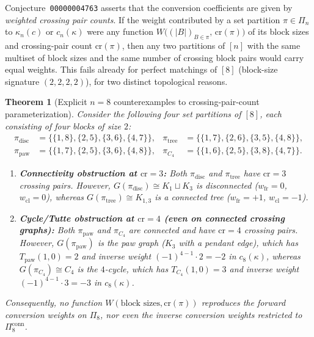 \documentclass[11pt,a4paper]{article}
\newtheorem{theorem}{Theorem}[section]
\theoremstyle{definition}
\theoremstyle{remark}
\newcommand{\conn}{\mathrm{conn}}
\newcommand{\crpair}{\mathrm{cr}}
\newcommand{\cl}{\mathrm{cl}}
\newcommand{\fr}{\mathrm{fr}}
\begin{document}
Conjecture~\texttt{00000004763} asserts that the conversion coefficients are given by \emph{weighted crossing pair counts}. If the weight contributed by a set partition $\pi \in \Pi_n$ to $\kappa_n(c)$ or $c_n(\kappa)$ were any function $W\bigl((|B|)_{B \in \pi},\, \crpair(\pi)\bigr)$ of its block sizes and crossing-pair count $\crpair(\pi)$, then any two partitions of $[n]$ with the same multiset of block sizes and the same number of crossing block pairs would carry equal weights. This fails already for perfect matchings of $[8]$ (block-size signature $(2,2,2,2)$), for two distinct topological reasons.

\begin{theorem}[Explicit $n = 8$ counterexamples to crossing-pair-count parameterization]\label{thm:crossing-ce}
Consider the following four set partitions of $[8]$, each consisting of four blocks of size $2$:
\begin{align*}
  \pi_{\mathrm{disc}} &= \bigl\{\{1,8\},\{2,5\},\{3,6\},\{4,7\}\bigr\}, &
  \pi_{\mathrm{tree}} &= \bigl\{\{1,7\},\{2,6\},\{3,5\},\{4,8\}\bigr\},\\
  \pi_{\mathrm{paw}}  &= \bigl\{\{1,7\},\{2,5\},\{3,6\},\{4,8\}\bigr\}, &
  \pi_{C_4}           &= \bigl\{\{1,6\},\{2,5\},\{3,8\},\{4,7\}\bigr\}.
\end{align*}
\begin{enumerate}
  \item[(a)] \textbf{Connectivity obstruction at $\crpair = 3$:} Both $\pi_{\mathrm{disc}}$ and $\pi_{\mathrm{tree}}$ have $\crpair = 3$ crossing pairs. However, $G(\pi_{\mathrm{disc}}) \cong K_1 \sqcup K_3$ is disconnected ($w_{\fr} = 0$, $w_{\cl} = 0$), whereas $G(\pi_{\mathrm{tree}}) \cong K_{1,3}$ is a connected tree ($w_{\fr} = +1$, $w_{\cl} = -1$).
  \item[(b)] \textbf{Cycle/Tutte obstruction at $\crpair = 4$ (even on connected crossing graphs):} Both $\pi_{\mathrm{paw}}$ and $\pi_{C_4}$ are connected and have $\crpair = 4$ crossing pairs. However, $G(\pi_{\mathrm{paw}})$ is the paw graph ($K_3$ with a pendant edge), which has $T_{\mathrm{paw}}(1,0) = 2$ and inverse weight $(-1)^{4-1}\cdot 2 = -2$ in $c_8(\kappa)$, whereas $G(\pi_{C_4}) \cong C_4$ is the $4$-cycle, which has $T_{C_4}(1,0) = 3$ and inverse weight $(-1)^{4-1}\cdot 3 = -3$ in $c_8(\kappa)$.
\end{enumerate}
Consequently, no function $W(\text{block sizes}, \crpair(\pi))$ reproduces the forward conversion weights on $\Pi_8$, nor even the inverse conversion weights restricted to $\Pi_8^{\conn}$.
\end{theorem}
\end{document}
